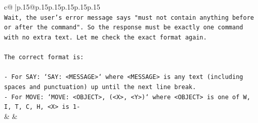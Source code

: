 \documentclass{article}
\begin{document}
{\begin{supertabular}{c@{$\;$}|p{.15\linewidth}@{}p{.15\linewidth}p{.15\linewidth}p{.15\linewidth}p{.15\linewidth}p{.15\linewidth}}
{{{\\ 
\texttt{Wait, the user's error message says "must not contain anything before or after the command". So the response must be exactly one command with no extra text. Let me check the exact format again.} \\
\\ 
\texttt{The correct format is:} \\
\\ 
\texttt{{-} For SAY: `SAY: <MESSAGE>` where <MESSAGE> is any text (including spaces and punctuation) up until the next line break.} \\
\texttt{{-} For MOVE: `MOVE: <OBJECT>, (<X>, <Y>)` where <OBJECT> is one of W, I, T, C, H, <X> is 1{-}} \\
            }
        }
    }
    & & \\ \\


\end{supertabular}}
\end{document}
